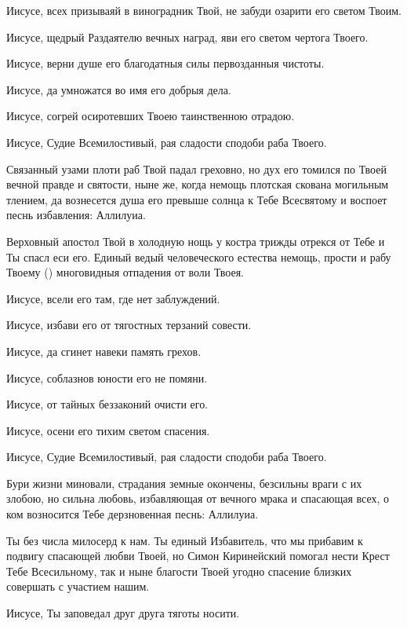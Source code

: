 \begin{mymulticols}
Иисусе, всех призываяй в виноградник Твой, не забуди озарити его светом Твоим. 

Иисусе, щедрый Раздаятелю вечных наград, яви его светом чертога Твоего. 

Иисусе, верни душе его благодатныя силы первозданныя чистоты. 

Иисусе, да умножатся во имя его добрыя дела. 

Иисусе, согрей осиротевших Твоею таинственною отрадою. 

Иисусе, Судие Всемилостивый, рая сладости сподоби раба Твоего.


Связанный узами плоти раб Твой падал греховно, но дух его томился по Твоей вечной правде и святости, ныне же, когда немощь плотская скована могильным тлением, да вознесется душа его превыше солнца к Тебе Всесвятому и воспоет песнь избавления: Аллилуиа.


Верховный апостол Твой в холодную нощь у костра трижды отрекся от Тебе и Ты спасл еси его. Единый ведый человеческого естества немощь, прости и рабу Твоему () многовидныя отпадения от воли Твоея. 

Иисусе, всели его там, где нет заблуждений. 

Иисусе, избави его от тягостных терзаний совести. 

Иисусе, да сгинет навеки память грехов. 

Иисусе, соблазнов юности его не помяни. 

Иисусе, от тайных беззаконий очисти его. 

Иисусе, осени его тихим светом спасения. 

Иисусе, Судие Всемилостивый, рая сладости сподоби раба Твоего.


Бури жизни миновали, страдания земные окончены, безсильны враги с их злобою, но сильна любовь, избавляющая от вечного мрака и спасающая всех, о ком возносится Тебе дерзновенная песнь: Аллилуиа.


Ты без числа милосерд к нам. Ты единый Избавитель, что мы прибавим к подвигу спасающей любви Твоей, но Симон Киринейский помогал нести Крест Тебе Всесильному, так и ныне благости Твоей угодно спасение близких совершать с участием нашим. 

Иисусе, Ты заповедал друг друга тяготы носити. 


\end{mymulticols}
